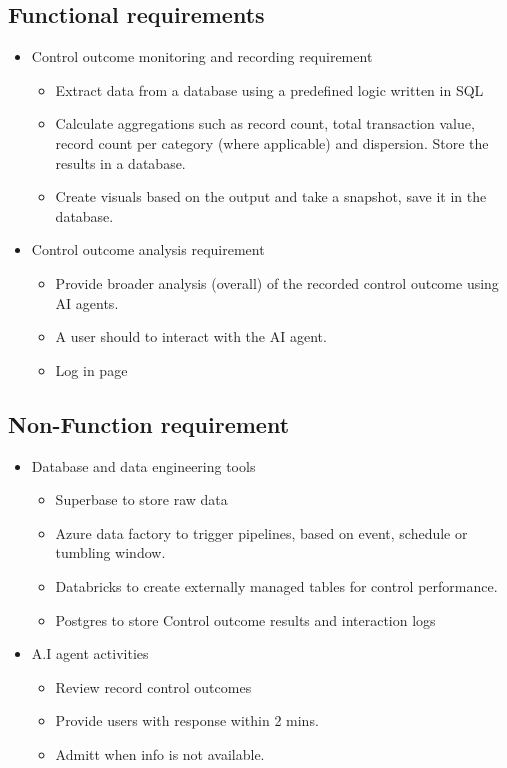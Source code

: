 \documentclass{article}
\begin{document}
\subsection{Functional requirements}
\begin{itemize}
    \item Control outcome monitoring and recording requirement
    \begin{itemize}
        \item Extract data from a database using a predefined logic written in SQL
        \item Calculate aggregations such as record count, total transaction value, record count per category (where applicable) and dispersion. Store the results in a database.
        \item Create visuals based on the output and take a snapshot, save it in the database.
    \end{itemize}
    \item Control outcome analysis requirement
    \begin{itemize}
        \item Provide broader analysis (overall) of the recorded control outcome using AI agents.
        \item A user should to interact with the AI agent.
        \item Log in page
    \end{itemize} 
\end{itemize}
\subsection{Non-Function requirement}
\begin{itemize}
    \item Database and data engineering tools
    \begin{itemize}
        \item Superbase to store raw data
        \item Azure data factory to trigger pipelines, based on event, schedule or tumbling window.
        \item Databricks to create externally managed tables for control performance.
        \item Postgres to store Control outcome results and interaction logs
    \end{itemize}
    \item A.I agent activities 
    \begin{itemize}
        \item Review record control outcomes
        \item Provide users with response within 2 mins.
        \item Admitt when info is not available.
    \end{itemize}
\end{itemize}
\end{document}
